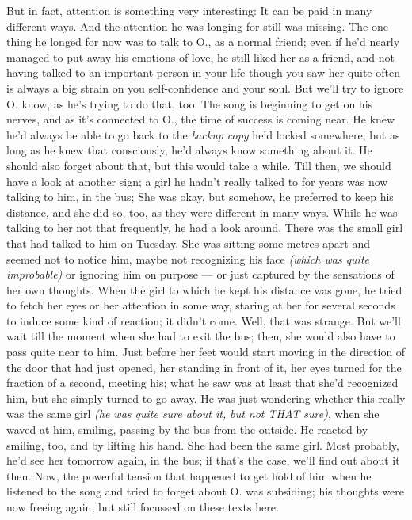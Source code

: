 But in fact, attention is something very interesting: It can be paid in many different ways. And the attention he was longing for still was missing. 
The one thing he longed for now was to talk to O., as a normal friend; even if he'd nearly managed to put away his emotions of love, he still liked her as a friend, and not having talked to an important person in your life though you saw her quite often is always a big strain on you self-confidence and your soul. 
But we'll try to ignore O. know, as he's trying to do that, too: The song is beginning to get on his nerves, and as it's connected to O., the time of success is coming near. 
He knew he'd always be able to go back to the \emph{backup copy} he'd locked somewhere; but as long as he knew that consciously, he'd always know something about it. He should also forget about that, but this would take a while. 
Till then, we should have a look at another sign; a girl he hadn't really talked to for years was now talking to him, in the bus; She was okay, but somehow, he preferred to keep his distance, and she did so, too, as they were different in many ways. 
While he was talking to her not that frequently, he had a look around. There was the small girl that had talked to him on Tuesday. She was sitting some metres apart and seemed not to notice him, maybe not recognizing his face \emph{(which was quite improbable)} or ignoring him on purpose --- or just captured by the sensations of her own thoughts. 
When the girl to which he kept his distance was gone, he tried to fetch her eyes or her attention in some way, staring at her for several seconds to induce some kind of reaction; it didn't come. 
Well, that was strange. 
But we'll wait till the moment when she had to exit the bus; then, she would also have to pass quite near to him. Just before her feet would start moving in the direction of the door that had just opened, her standing in front of it, her eyes turned for the fraction of a second, meeting his; what he saw was at least that she'd recognized him, but she simply turned to go away. He was just wondering whether this really was the same girl \emph{(he was quite sure about it, but not THAT sure)}, when she waved at him, smiling, passing by the bus from the outside. He reacted by smiling, too, and by lifting his hand. 
She had been the same girl. 
Most probably, he'd see her tomorrow again, in the bus; if that's the case, we'll find out about it then. 
Now, the powerful tension that happened to get hold of him when he listened to the song and tried to forget about O. was subsiding; his thoughts were now freeing again, but still focussed on these texts here. 
